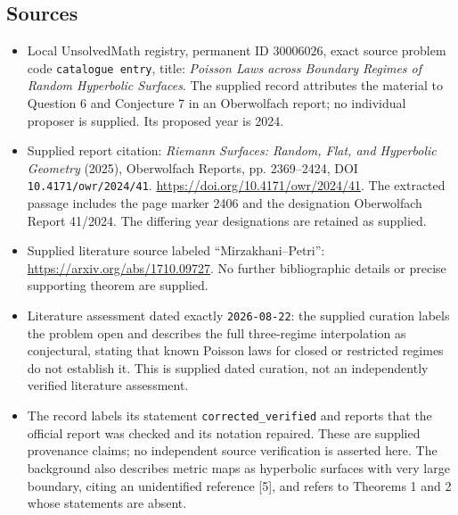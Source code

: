\documentclass[11pt]{article}
\begin{document}
\subsection{Sources}
\begin{itemize}
\item Local UnsolvedMath registry, permanent ID \(30006026\), exact source problem code \texttt{catalogue entry}, title: \emph{Poisson Laws across Boundary Regimes of Random Hyperbolic Surfaces}. The supplied record attributes the material to Question 6 and Conjecture 7 in an Oberwolfach report; no individual proposer is supplied. Its proposed year is 2024.
\item Supplied report citation: \emph{Riemann Surfaces: Random, Flat, and Hyperbolic Geometry} (2025), Oberwolfach Reports, pp. 2369--2424, DOI \texttt{10.4171/owr/2024/41}. \url{https://doi.org/10.4171/owr/2024/41}. The extracted passage includes the page marker 2406 and the designation Oberwolfach Report 41/2024. The differing year designations are retained as supplied.
\item Supplied literature source labeled ``Mirzakhani--Petri'': \url{https://arxiv.org/abs/1710.09727}. No further bibliographic details or precise supporting theorem are supplied.
\item Literature assessment dated exactly \texttt{2026-08-22}: the supplied curation labels the problem open and describes the full three-regime interpolation as conjectural, stating that known Poisson laws for closed or restricted regimes do not establish it. This is supplied dated curation, not an independently verified literature assessment.
\item The record labels its statement \texttt{corrected\_verified} and reports that the official report was checked and its notation repaired. These are supplied provenance claims; no independent source verification is asserted here. The background also describes metric maps as hyperbolic surfaces with very large boundary, citing an unidentified reference [5], and refers to Theorems 1 and 2 whose statements are absent.
\end{itemize}
\end{document}
